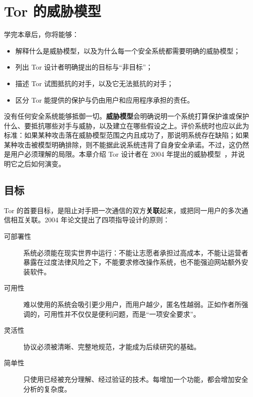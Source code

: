 \chapter{Tor 的威胁模型}\label{cap:04-modello-minaccia}

\begin{obiettivi}
学完本章后，你将能够：
\begin{itemize}[nosep]
  \item 解释什么是威胁模型，以及为什么每一个安全系统都需要明确的威胁模型；
  \item 列出 Tor 设计者明确提出的目标与\enquote{非目标}；
  \item 描述 Tor 试图抵抗的对手，以及它无法抵抗的对手；
  \item 区分 Tor 能提供的保护与仍由用户和应用程序承担的责任。
\end{itemize}
\end{obiettivi}

没有任何安全系统能够抵御一切。\textbf{威胁模型}会明确说明一个系统打算保护谁或保护什么、要抵抗哪些对手与威胁，以及建立在哪些假设之上。评价系统时也应以此为标准：如果某种攻击落在威胁模型范围之内且成功了，那说明系统存在缺陷；如果某种攻击被模型明确排除，则不能据此说系统违背了自身安全承诺。不过，这仍然是用户必须理解的局限。本章介绍 Tor 设计者在 2004 年提出的威胁模型~\cite{dingledine2004tor}，并说明它之后如何演变。

\section{目标}\label{sec:minaccia-obiettivi}

Tor 的首要目标，是阻止对手把一次通信的双方\textbf{关联}起来，或把同一用户的多次通信相互关联。2004 年论文提出了四项指导设计的原则：
\begin{description}
  \item[可部署性] 系统必须能在现实世界中运行：不能让志愿者承担过高成本，不能让运营者暴露在过度法律风险之下，不能要求修改操作系统，也不能强迫网站额外安装软件。
  \item[可用性] 难以使用的系统会吸引更少用户，而用户越少，匿名性越弱。正如作者所强调的，可用性并不仅仅是便利问题，而是\enquote{一项安全要求}。
  \item[灵活性] 协议必须被清晰、完整地规范，才能成为后续研究的基础。
  \item[简单性] 只使用已经被充分理解、经过验证的技术。每增加一个功能，都会增加安全分析的复杂度。
\end{description}

